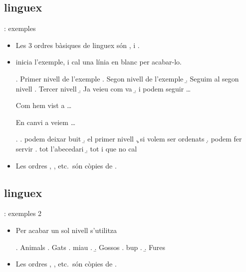 \subsection{linguex}
\begin{frame}[fragile]{\insertsubsection{}: exemples}
\begin{itemize}
\item Les 3 ordres bàsiques de linguex són ,  i . 
\item {} inicia l'exemple, i cal una línia en blanc per acabar-lo.
\begin{exampletwouptiny2}
\ex. Primer nivell de l'exemple
\a. Segon nivell de l'exemple
\b. Seguim al segon nivell 
\a. Tercer nivell 
\b. Ja veieu com va 
\b. i podem seguir \dots

Com hem vist a \Last \dots

En canvi a \Next veiem \dots

\ex. 
\a. podem deixar buit 
\b. el primer nivell
\c. si volem ser ordenats
\d. podem fer servir
\e. tot l'abecedari
\b. tot i que no cal

\end{exampletwouptiny2}
\item Les ordres , , etc.~són còpies de .
\end{itemize}
\end{frame}

\subsection{linguex}
\begin{frame}[fragile]{\insertsubsection{}: exemples 2}
\begin{itemize}
\item Per acabar un sol nivell s'utilitza  
\begin{exampletwouptiny2}
\ex. Animals 
\a. Gats
\a. miau
\z.
\b. Gossos
\a. bup
\z.
\b. Fures

\end{exampletwouptiny2}
\item Les ordres , , etc.~són còpies de .
\end{itemize}
\end{frame}

